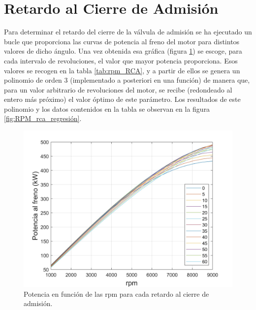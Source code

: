 \section{Retardo al Cierre de Admisión} \label{s:section_03}
Para determinar el retardo del cierre de la válvula de admisión se ha ejecutado un bucle que proporciona las curvas de potencia al freno del motor para distintos valores de dicho ángulo. Una vez obtenida esa gráfica (figura \ref{fig:RPM_rca}) se escoge, para cada intervalo de revoluciones, el valor que mayor potencia proporciona. Esos valores se recogen en la tabla \ref{tab:rpm_RCA}, y a partir de ellos se genera un polinomio de orden 3 (implementado a posteriori en una función) de manera que, para un valor arbitrario de revoluciones del motor, se recibe (redondeado al entero más próximo) el valor óptimo de este parámetro. Los resultados de este polinomio y los datos contenidos en la tabla se observan en la figura \ref{fig:RPM_rca_regresión}.

\begin{figure}[H]
    \centering
    \includegraphics[width=0.6\linewidth]{Figures/01/Potencia_rpm_rca.jpg}
    \caption{Potencia en función de las rpm para cada retardo al cierre de admisión.}
    \label{fig:RPM_rca}
\end{figure}

\begin{table}[htbp]
    \centering
    \caption{Retardos de cierre de admisión que obtienen mayor potencia en función de las rpm.}
    \label{tab:rpm_RCA}
\end{table}

